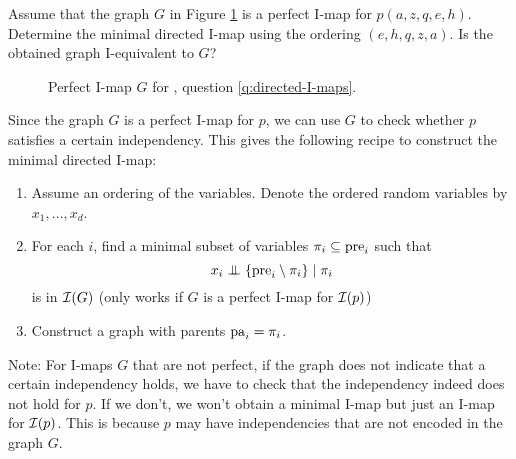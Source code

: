 \label{ex:minimal-I-maps-1}
\begin{exenumerate}
\item Assume that the graph $G$ in Figure \ref{fig:I-map} is a perfect I-map for $p(a,z,q,e,h)$. Determine the minimal 
  directed I-map using the ordering $(e,h,q,z,a)$. Is the obtained graph I-equivalent to $G$?
  \begin{figure}[ht]
    \begin{center}
    \end{center}
    \caption{\label{fig:I-map} Perfect I-map $G$ for , question \ref{q:directed-I-maps}.}
    \end{figure}
\label{q:directed-I-maps}
  \begin{solution} Since the graph $G$ is a perfect I-map for $p$, we can use
    $G$ to check whether $p$ satisfies a certain
    independency. This gives the following
    recipe to construct the minimal directed I-map:
    \begin{enumerate}
    \item Assume an ordering of the
    variables. Denote the ordered random variables by $x_1, \ldots, x_d$.
    \item For each $i$, find a minimal subset of variables
    $\pi_i \subseteq \mathrm{pre}_i$ such that $$
    x_i \mathrel{\perp\mspace{-10mu}\perp} \{\mathrm{pre}_i \setminus \pi_i \} \mid \pi_i$$ is in
    $\mathcal{I}(G)$ (only works if $G$ is a perfect I-map for
    $\mathcal{I}(p)$)
    \item Construct a graph with parents $\mathrm{pa}_i=\pi_i$.
    \end{enumerate}
   
    Note: For I-maps $G$ that are not perfect, if the graph does not
    indicate that a certain independency holds, we have to check
    that the independency indeed does not hold for $p$. If we
    don't, we won't obtain a minimal I-map but just an I-map for
    $\mathcal{I}(p)$. This is because $p$ may have independencies that are
    not encoded in the graph $G$. 


\end{solution}
\end{exenumerate}
